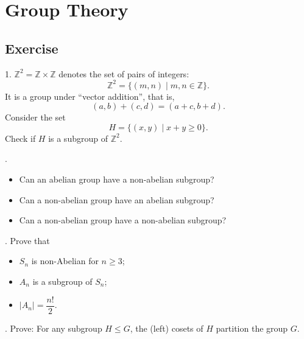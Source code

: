 \documentclass[12pt]{article}
\begin{document}
	\section{Group Theory}
		\subsection{Exercise}
		1. $\mathbb{Z}^2 = \mathbb{Z} \times \mathbb{Z}$ denotes the set of pairs of integers:
		 	$$ \mathbb{Z}^2 = \{(m, n) \mid m, n \in \mathbb{Z}\}.$$ It is a group under ``vector addition'', 
		 	that is, $$(a, b) + (c, d) = (a + c, b + d).$$ Consider the set $$H = \{(x, y) \mid x + y \geqslant 0\}.$$ 
		 	Check if $H$ is a subgroup of $\mathbb{Z}^2$.
		\par {}. \begin{itemize}
			\item Can an abelian group have a non-abelian subgroup?
			\item Can a non-abelian group have an abelian subgroup?
			\item Can a non-abelian group have a non-abelian subgroup?
		\end{itemize}
		\par 
		. Prove that 
		\begin{itemize}
			\item $S_n$ is non-Abelian for $n \geqslant 3$;
			\item $A_n$ is a subgroup of $S_n$;
			\item  $|A_n| = \dfrac{n!}{2}$.
		\end{itemize}
		\par {}. Prove: For any subgroup $H \leq G$, the (left) cosets of $H$ partition the group $G$.
\end{document}
